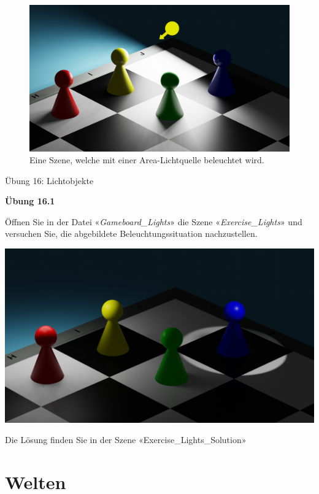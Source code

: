 \documentclass[
]{book}
\begin{document}
\begin{figure}

\includegraphics{Chapters/Images/Chapter_34/34_5_Arealight.png}

\caption{\label{fig-1_5}Eine Szene, welche mit einer Area-Lichtquelle
beleuchtet wird.}

\end{figure}%

Übung 16: Lichtobjekte

\textbf{Übung 16.1}

Öffnen Sie in der Datei «\emph{Gameboard\_Lights}» die Szene
«\emph{Exercise\_Lights}» und versuchen Sie, die abgebildete
Beleuchtungssituation nachzustellen.

\includegraphics{Chapters/Images/Chapter_34/Exercise_16_1.png}\hfill

Die Lösung finden Sie in der Szene «Exercise\_Lights\_Solution»

\chapter{Welten}\label{welten}
\end{document}
